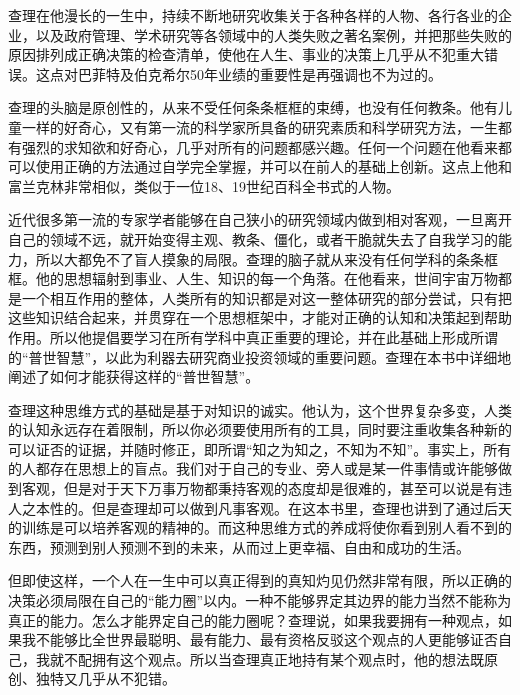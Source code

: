 查理在他漫长的一生中，持续不断地研究收集关于各种各样的人物、各行各业的企业，以及政府管理、学术研究等各领域中的人类失败之著名案例，并把那些失败的原因排列成正确决策的检查清单，使他在人生、事业的决策上几乎从不犯重大错误。这点对巴菲特及伯克希尔50年业绩的重要性是再强调也不为过的。
\par

查理的头脑是原创性的，从来不受任何条条框框的束缚，也没有任何教条。他有儿童一样的好奇心，又有第一流的科学家所具备的研究素质和科学研究方法，一生都有强烈的求知欲和好奇心，几乎对所有的问题都感兴趣。任何一个问题在他看来都可以使用正确的方法通过自学完全掌握，并可以在前人的基础上创新。这点上他和富兰克林非常相似，类似于一位18、19世纪百科全书式的人物。
\par

近代很多第一流的专家学者能够在自己狭小的研究领域内做到相对客观，一旦离开自己的领域不远，就开始变得主观、教条、僵化，或者干脆就失去了自我学习的能力，所以大都免不了盲人摸象的局限。查理的脑子就从来没有任何学科的条条框框。他的思想辐射到事业、人生、知识的每一个角落。在他看来，世间宇宙万物都是一个相互作用的整体，人类所有的知识都是对这一整体研究的部分尝试，只有把这些知识结合起来，并贯穿在一个思想框架中，才能对正确的认知和决策起到帮助作用。所以他提倡要学习在所有学科中真正重要的理论，并在此基础上形成所谓的“普世智慧”，以此为利器去研究商业投资领域的重要问题。查理在本书中详细地阐述了如何才能获得这样的“普世智慧”。
\par

查理这种思维方式的基础是基于对知识的诚实。他认为，这个世界复杂多变，人类的认知永远存在着限制，所以你必须要使用所有的工具，同时要注重收集各种新的可以证否的证据，并随时修正，即所谓“知之为知之，不知为不知”。事实上，所有的人都存在思想上的盲点。我们对于自己的专业、旁人或是某一件事情或许能够做到客观，但是对于天下万事万物都秉持客观的态度却是很难的，甚至可以说是有违人之本性的。但是查理却可以做到凡事客观。在这本书里，查理也讲到了通过后天的训练是可以培养客观的精神的。而这种思维方式的养成将使你看到别人看不到的东西，预测到别人预测不到的未来，从而过上更幸福、自由和成功的生活。
\par

但即使这样，一个人在一生中可以真正得到的真知灼见仍然非常有限，所以正确的决策必须局限在自己的“能力圈”以内。一种不能够界定其边界的能力当然不能称为真正的能力。怎么才能界定自己的能力圈呢？查理说，如果我要拥有一种观点，如果我不能够比全世界最聪明、最有能力、最有资格反驳这个观点的人更能够证否自己，我就不配拥有这个观点。所以当查理真正地持有某个观点时，他的想法既原创、独特又几乎从不犯错。
\par


